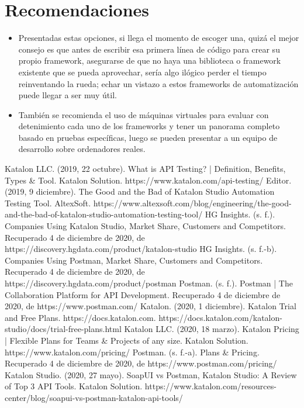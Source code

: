 \documentclass[twoside,twocolumn]{article}
\begin{document}
\section{Recomendaciones}


\begin{itemize}
\item Presentadas estas opciones, si llega el momento de escoger una, quizá el mejor consejo es que antes de escribir esa primera línea de código para crear su propio framework, asegurarse de que no haya una biblioteca o framework existente que se pueda aprovechar, sería algo ilógico perder el tiempo reinventando la rueda; echar un vistazo a estos frameworks de automatización puede llegar a ser muy útil.
\item También se recomienda el uso de máquinas virtuales para evaluar con detenimiento cada uno de los frameworks y tener un panorama completo basado en pruebas específicas, luego se pueden presentar a un equipo de desarrollo sobre ordenadores reales.
\end{itemize}




\begin{thebibliography}{99} 

\bibitem[1]{}
\newblock Katalon LLC. (2019, 22 octubre). What is API Testing? | Definition, Benefits, Types \& Tool. Katalon Solution. https://www.katalon.com/api-testing/
\bibitem[2]{}
\newblock Editor. (2019, 9 diciembre). The Good and the Bad of Katalon Studio Automation Testing Tool. AltexSoft. https://www.altexsoft.com/blog/engineering/the-good-and-the-bad-of-katalon-studio-automation-testing-tool/
\bibitem[3]{}
\newblock HG Insights. (s. f.). Companies Using Katalon Studio, Market Share, Customers and Competitors. Recuperado 4 de diciembre de 2020, de https://discovery.hgdata.com/product/katalon-studio
\bibitem[4]{}
\newblock HG Insights. (s. f.-b). Companies Using Postman, Market Share, Customers and Competitors. Recuperado 4 de diciembre de 2020, de https://discovery.hgdata.com/product/postman
\bibitem[5]{}
\newblock Postman. (s. f.). Postman | The Collaboration Platform for API Development. Recuperado 4 de diciembre de 2020, de https://www.postman.com/
\bibitem[6]{}
\newblock Katalon. (2020, 1 diciembre). Katalon Trial and Free Plans. https://docs.katalon.com. https://docs.katalon.com/katalon-studio/docs/trial-free-plans.html
\bibitem[7]{}
\newblock Katalon LLC. (2020, 18 marzo). Katalon Pricing | Flexible Plans for Teams \& Projects of any size. Katalon Solution. https://www.katalon.com/pricing/
\bibitem[8]{}
\newblock Postman. (s. f.-a). Plans \& Pricing. Recuperado 4 de diciembre de 2020, de https://www.postman.com/pricing/
\bibitem[9]{}
\newblock Katalon Studio. (2020, 27 mayo). SoapUI vs Postman, Katalon Studio: A Review of Top 3 API Tools. Katalon Solution. https://www.katalon.com/resources-center/blog/soapui-vs-postman-katalon-api-tools/
\end{thebibliography}

\end{document}
